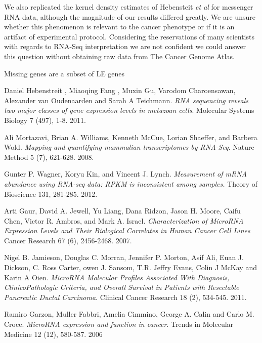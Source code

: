 \documentclass[12pt]{report}
\begin{document}
  We also replicated the kernel density estimates of Hebensteit \textit{et al} for messenger RNA data, although the
  magnitude of our results differed greatly. We are unsure whether this phenomenon is relevant to the cancer phenotype or if it is an artifact of experimental protocol. Considering the reservations of
  many scientists with regards to RNA-Seq interpretation we are not confident we could answer this question without obtaining raw data from The Cancer Genome Atlas.
  
  
  Missing genes are a subset of LE genes


\begin{thebibliography}{99}

  Daniel Hebenstreit , Miaoqing Fang , Muxin Gu, Varodom Charoensawan, Alexander van Oudenaarden
and Sarah A Teichmann.
  \emph{RNA sequencing reveals two major classes of gene expression levels in metazoan cells}.
  Molecular Systems Biology 7 (497), 1-8. 2011.

  Ali Mortazavi, Brian A. Williams, Kenneth McCue, Lorian Shaeffer, and Barbera Wold.
  \emph{Mapping and quantifying mammalian transcriptomes by RNA-Seq}.
  Nature Method 5 (7), 621-628. 2008.
  
  Gunter P. Wagner, Koryu Kin, and Vincent J. Lynch.
  \emph{Measurement of mRNA abundance using RNA-seq data: RPKM is inconsistent among samples.}
  Theory of Bioscience 131, 281-285. 2012.

  
  Arti Gaur, David A. Jewell, Yu Liang, Dana Ridzon, Jason H. Moore, Caifu Chen, Victor R. Ambros, and Mark A. Israel.
  \emph{Characterization of MicroRNA Expression Levels and Their Biological Correlates in Human Cancer Cell Lines}
  Cancer Research 67 (6), 2456-2468. 2007.
  
  Nigel B. Jamieson, Douglas C. Morran, Jennifer P. Morton, Asif Ali, Euan J. Dickson, C. Ross Carter, owen J. Sansom,
  T.R. Jeffry Evans, Colin J McKay and Karin A Oien.
  \emph{MicroRNA Molecular Profiles Associated With Diagnosis, ClinicoPathologic Criteria, and Overall Survival in Patients
  with Resectable Pancreatic Ductal Carcinoma}.
  Clinical Cancer Research 18 (2), 534-545. 2011.
  
  Ramiro Garzon, Muller Fabbri, Amelia Cimmino, George A. Calin and Carlo M. Croce.
  \emph{MicroRNA expression and function in cancer}.
  Trends in Molecular Medicine 12 (12), 580-587. 2006
  
  \bibitem
\end{thebibliography}
\end{document}
